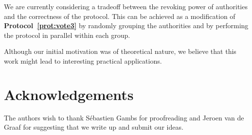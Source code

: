 \documentclass[runningheads]{llncs}
\begin{document}
We are currently considering a tradeoff between the revoking power
of authorities and the correctness of the protocol. This can be
achieved as a modification of \textbf{Protocol~\ref{prot:vote3}} by
randomly grouping the authorities and by performing the protocol in
parallel within each group.

Although our initial motivation was of theoretical nature, we
believe that this work might lead to interesting practical
applications.

\section*{Acknowledgements}
The authors wish to thank S\'ebastien Gambs for proofreading and
Jeroen van de Graaf for suggesting that  we write up and submit our
ideas.





\end{document}
